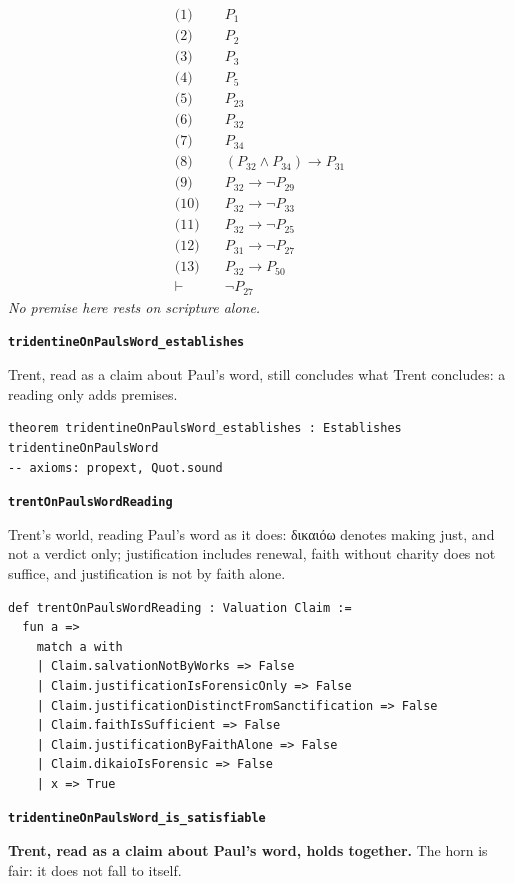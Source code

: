 \documentclass[11pt]{article}
\begin{document}
\begin{align*}
  \text{(1)} \quad & P_{1} \\
  \text{(2)} \quad & P_{2} \\
  \text{(3)} \quad & P_{3} \\
  \text{(4)} \quad & P_{5} \\
  \text{(5)} \quad & P_{23} \\
  \text{(6)} \quad & P_{32} \\
  \text{(7)} \quad & P_{34} \\
  \text{(8)} \quad & (P_{32} \land P_{34}) \rightarrow P_{31} \\
  \text{(9)} \quad & P_{32} \rightarrow \lnot P_{29} \\
  \text{(10)} \quad & P_{32} \rightarrow \lnot P_{33} \\
  \text{(11)} \quad & P_{32} \rightarrow \lnot P_{25} \\
  \text{(12)} \quad & P_{31} \rightarrow \lnot P_{27} \\
  \text{(13)} \quad & P_{32} \rightarrow P_{50} \\
  \vdash \quad & \lnot P_{27}
\end{align*}
\emph{No premise here rests on scripture alone.}
\par\medskip\noindent\textbf{\texttt{tridentine\allowbreak{}On\allowbreak{}Pauls\allowbreak{}Word\_\allowbreak{}establishes}}\par\nobreak\noindent
Trent, read as a claim about Paul's word, still concludes what Trent concludes: a reading only adds premises.

{\small\begin{verbatim}
theorem tridentineOnPaulsWord_establishes : Establishes tridentineOnPaulsWord
-- axioms: propext, Quot.sound
\end{verbatim}}
\par\medskip\noindent\textbf{\texttt{trent\allowbreak{}On\allowbreak{}Pauls\allowbreak{}Word\allowbreak{}Reading}}\par\nobreak\noindent
Trent's world, reading Paul's word as it does: δικαιόω denotes making just, and not a verdict only; justification includes renewal, faith without charity does not suffice, and justification is not by faith alone.

{\small\begin{verbatim}
def trentOnPaulsWordReading : Valuation Claim :=
  fun a =>
    match a with
    | Claim.salvationNotByWorks => False
    | Claim.justificationIsForensicOnly => False
    | Claim.justificationDistinctFromSanctification => False
    | Claim.faithIsSufficient => False
    | Claim.justificationByFaithAlone => False
    | Claim.dikaioIsForensic => False
    | x => True
\end{verbatim}}
\par\medskip\noindent\textbf{\texttt{tridentine\allowbreak{}On\allowbreak{}Pauls\allowbreak{}Word\_\allowbreak{}is\_\allowbreak{}satisfiable}}\par\nobreak\noindent
\textbf{Trent, read as a claim about Paul's word, holds together.} The horn is fair: it does not fall to itself.
\end{document}
